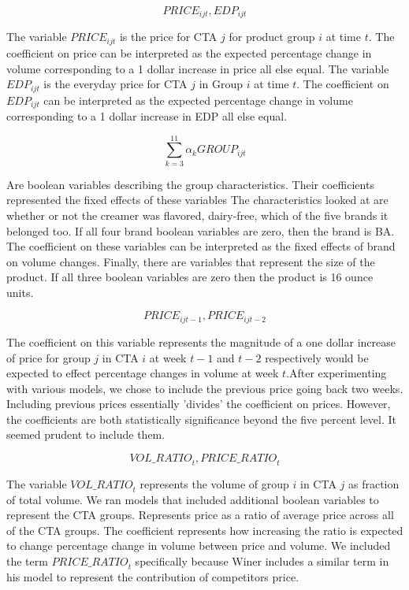 \documentclass{article}
\begin{document}
$${PRICE}_{ijt}, EDP_{ijt}$$ 

The variable ${PRICE}_{ijt}$ is the price for CTA $j$ for product group $i$ at time $t$. The coefficient on price can be interpreted as the expected percentage change in volume corresponding to a 1 dollar increase in price all else equal. The variable $EDP_{ijt}$ is the everyday price for CTA $j$ in Group $i$ at time $t$. The coefficient on $EDP_{ijt}$ can be interpreted as the expected percentage change in volume corresponding to a 1 dollar increase in EDP all else equal.

$$ \sum_{k=3}^{11} \alpha_k {GROUP}_{ijt} $$ 

Are boolean variables describing the group characteristics. Their coefficients represented the fixed effects of these variables The characteristics looked at are whether or not the creamer was flavored, dairy-free, which of the five brands it belonged too. If all four brand boolean variables are zero, then the brand is BA. The coefficient on these variables can be interpreted as the fixed effects of brand on volume changes. Finally, there are variables that represent the size of the product. If all three boolean variables are zero then the product is 16 ounce units.

$${PRICE}_{ijt-1}, {PRICE}_{ijt-2} $$

The coefficient on this variable represents the magnitude of a one dollar increase of price for group $j$ in CTA $i$ at week $t-1$ and $t-2$ respectively would be expected to effect percentage changes in volume at week $t$.After experimenting with various models, we chose to include the previous price going back two weeks. Including previous prices essentially 'divides' the coefficient on prices. However, the coefficients are both statistically significance beyond the five percent level. It seemed prudent to include them.

$${VOL\_RATIO}_t, {PRICE\_RATIO}_{t} $$ 

The variable $ {VOL\_RATIO}_t $ represents the volume of group $i$ in CTA $j$ as  fraction of total volume. We ran models that included additional boolean variables to represent the CTA groups. 
Represents price as a ratio of average price across all of the CTA groups. The coefficient represents how increasing the ratio is expected to change percentage change in volume between price and volume. We included the term ${PRICE\_RATIO}_{t}$  specifically because Winer includes a similar term in his model to represent the contribution of competitors price.
\end{document}
